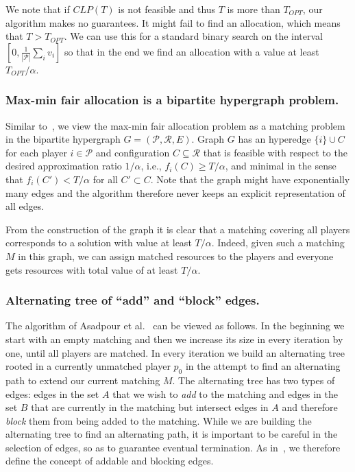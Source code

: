 \documentclass{llncs}
\newcommand{\res}{\ensuremath{\mathcal{R}}\xspace}
\newcommand{\players}{\ensuremath{\mathcal{P}}\xspace}
\begin{document}
We note that if $CLP(T)$ is not feasible and thus $T$ is more than $T_{OPT}$,
our algorithm makes no guarantees. It might fail to find an allocation, which
means that $T>T_{OPT}$. We can use this for a standard binary search  on the
interval $[0, \frac{1}{|\players|}\sum_i v_i]$ so that in the end we find an
allocation with a value at least $T_{OPT}/\alpha$.

\subsubsection{Max-min fair allocation is a bipartite hypergraph problem.}
Similar to~\cite{AFS08}, we view the max-min fair allocation problem as a
matching problem in the bipartite hypergraph $G=(\players, \res, E)$. Graph $G$
has an hyperedge $\{i\} \cup C$ for each player $i\in \players$ and
configuration $C \subseteq \res$ that is feasible with respect to the desired
approximation ratio $1/\alpha$, i.e., $f_i(C) \geq T/\alpha$, and minimal in the
sense that $f_i(C') < T/\alpha$ for all $C' \subset C$. Note that the graph
might have exponentially many edges and the algorithm therefore never keeps
an explicit representation of all edges.

From the construction of the graph it is clear that a matching covering all
players corresponds to a solution with value at least $T/\alpha$. Indeed, given
such a matching $M$ in this graph, we can assign matched resources to the
players and everyone gets resources with total value of at least $T/\alpha$.

\subsubsection{Alternating tree of ``add'' and ``block'' edges.}

The algorithm of Asadpour et al.~\cite{AFS08} can be viewed as
follows. In the beginning we start with an empty matching and then we
increase its size in every iteration by one, until all players are
matched. In every iteration we build an alternating tree rooted in a
currently unmatched player $p_0$ in the attempt to find an alternating
path to extend our current matching $M$. The alternating tree has two
types of edges: edges in the set $A$ that we wish to \emph{add} to the
matching and edges in the set $B$ that are currently in the matching
but intersect edges in $A$ and therefore \emph{block} them from being
added to the matching. While we are building the alternating tree to
find an alternating path, it is important to be careful in the
selection of edges, so as to guarantee eventual termination. As
in~\cite{AFS08}, we therefore define the concept of addable and
blocking edges.
\end{document}
